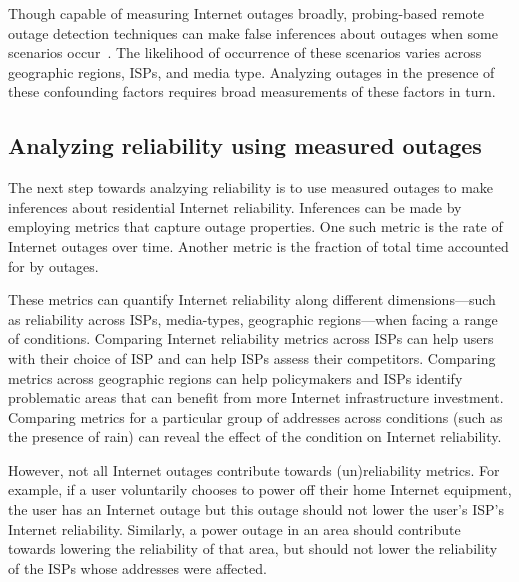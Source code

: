 

Though capable of measuring Internet outages broadly, probing-based remote outage detection techniques can
make false inferences about outages when some scenarios
occur~\cite{timeouts, addrchange-reasons}. The likelihood of
occurrence of these scenarios varies across geographic regions,
ISPs, and media type. Analyzing outages in the presence of these
confounding factors requires broad measurements of these factors in turn.

\subsection{Analyzing reliability using measured outages}


The next step towards analzying reliability is to use measured outages
to make inferences about residential Internet reliability. Inferences
can be made by employing metrics that capture outage properties. One such
metric is the rate of Internet outages over time. Another
metric is the fraction of total time accounted for by outages. 

These metrics can quantify Internet reliability along different
dimensions---such as reliability across ISPs, media-types, geographic
regions---when facing a range of conditions. Comparing Internet
reliability metrics across ISPs can help users with their choice of ISP and
can help ISPs assess their competitors. Comparing metrics across geographic
regions can help policymakers and ISPs identify problematic areas that
can benefit from more Internet infrastructure investment. Comparing
metrics for a particular group of addresses across conditions (such as
the presence of rain) can reveal the effect of the condition on
Internet reliability.

However, not all Internet outages contribute towards
(un)reliability metrics. For example, if a user voluntarily chooses to power
off their home Internet equipment, the user has an Internet outage but
this outage should not lower the user's ISP's Internet reliability. Similarly, a power
outage in an area should contribute towards lowering the reliability
of that area, but should not lower the reliability of the
ISPs whose addresses were affected. 

